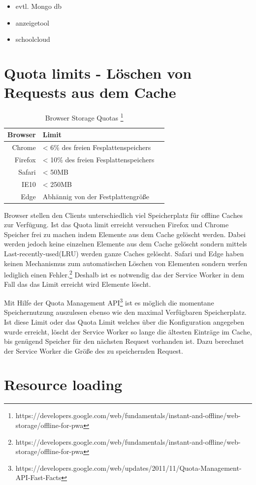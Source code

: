 \begin{itemize}
	\item 	evtl. Mongo db
	\item 	anzeigetool
	\item schoolcloud
\end{itemize}

\section{Quota limits - Löschen von Requests aus dem Cache}
\begin{table}[!htb]
	\caption{Browser Storage Quotas \footnote{https://developers.google.com/web/fundamentals/instant-and-offline/web-storage/offline-for-pwa}}
\begin{center}

	\begin{tabular}{|r|l|l|}
		\hline
		Browser	 & Limit \\ \hline
		Chrome & < 6\% des freien Fesplattenspeichers \\ \hline
		Firefox & < 10\% des freien Fesplattenspeichers \\ \hline
		Safari & < 50MB \\ \hline
		IE10 & < 250MB \\ \hline
		Edge & Abhännig von der Festplattengröße \\ 
		\hline
	\end{tabular}
\end{center}
\end{table}

Browser stellen den Clients unterschiedlich viel Speicherplatz für offline Caches zur Verfügung. Ist das Quota limit erreicht versuchen Firefox und Chrome Speicher frei zu machen indem Elemente aus dem Cache gelöscht werden. Dabei werden jedoch keine einzelnen Elemente aus dem Cache gelöscht sondern mittels Last-recently-used(LRU) werden ganze Caches gelöscht. Safari und Edge haben keinen Mechanismus zum automatischen Löschen von Elementen sondern werfen lediglich einen Fehler.\footnote{https://developers.google.com/web/fundamentals/instant-and-offline/web-storage/offline-for-pwa} Deshalb ist es notwendig das der Service Worker in dem Fall das das Limit erreicht wird Elemente löscht.

Mit Hilfe der Quota Management API\footnote{https://developers.google.com/web/updates/2011/11/Quota-Management-API-Fast-Facts} ist es möglich die momentane Speichernutzung auszulesen ebenso wie den maximal Verfügbaren Speicherplatz. Ist diese Limit oder das Quota Limit welches über die Konfiguration angegeben wurde erreicht, löscht der Service Worker so lange die ältesten Einträge im Cache, bis genügend Speicher für den nächsten Request vorhanden ist. Dazu berechnet der Service Worker die Größe des zu speichernden Request. 


\section{Resource loading}
